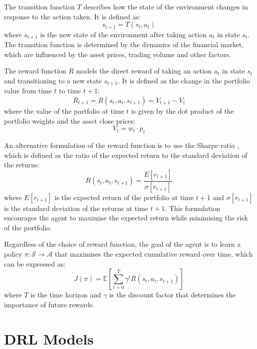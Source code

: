 The transition function $T$ describes how the state of the environment changes in response to the action taken. It is defined as:
\begin{equation}
    s_{t+1} = T(s_t, a_t)
\end{equation}
where $s_{t+1}$ is the new state of the environment after taking action $a_t$ in state $s_t$. The transition function is determined by the dynamics of the financial market, which are influenced by the asset prices, trading volume and other factors.

The reward function $R$ models the direct reward of taking an action $a_t$ in state $s_t$ and transitioning to a new state $s_{t+1}$. It is defined as the change in the portfolio value from time $t$ to time $t+1$:
\begin{equation}
    R_{t+1} = R(s_t, a_t, s_{t+1}) = V_{t+1} - V_t
\end{equation}
where the value of the portfolio at time $t$ is given by the dot product of the portfolio weights and the asset close prices:
\begin{equation}
    V_t = w_t \cdot p_t
\end{equation}

An alternative formulation of the reward function is to use the Sharpe ratio \cite{Sharpe1994}, which is defined as the ratio of the expected return to the standard deviation of the returns:
\begin{equation}
    R(s_t, a_t, s_{t+1}) = \frac{E[r_{t+1}]}{\sigma[r_{t+1}]}
\end{equation}
where $E[r_{t+1}]$ is the expected return of the portfolio at time $t+1$ and $\sigma[r_{t+1}]$ is the standard deviation of the returns at time $t+1$. This formulation encourages the agent to maximise the expected return while minimising the risk of the portfolio.

Regardless of the choice of reward function, the goal of the agent is to learn a policy $\pi: \mathcal{S} \to \mathcal{A}$ that maximises the expected cumulative reward over time, which can be expressed as:
\begin{equation}
    J(\pi) = \mathbb{E} \left[\sum_{t=0}^{T} \gamma^t R(s_t, a_t, s_{t+1}) \right]
\end{equation} 
where $T$ is the time horizon and $\gamma$ is the discount factor that determines the importance of future rewards. 

\section{DRL Models} \label{sec:drl-models}

